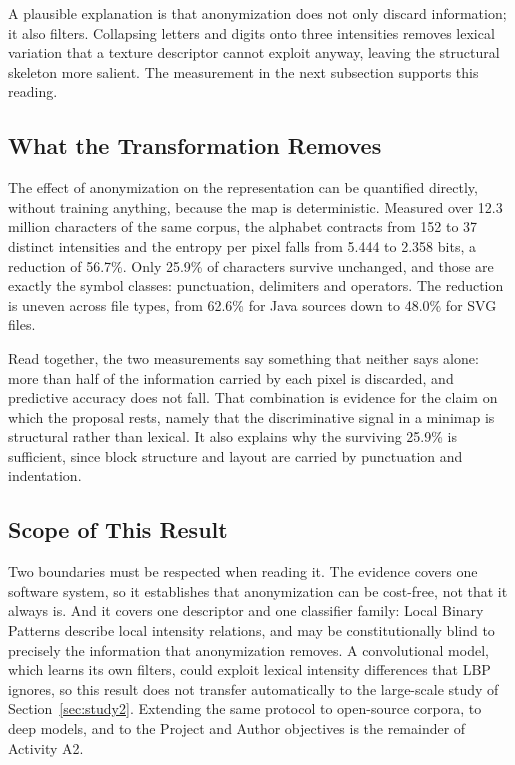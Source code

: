 A plausible explanation is that anonymization does not only discard
information; it also filters. Collapsing letters and digits onto three
intensities removes lexical variation that a texture descriptor cannot exploit
anyway, leaving the structural skeleton more salient. The measurement in the next subsection
supports this reading.

\subsection{What the Transformation Removes}

The effect of anonymization on the representation can be quantified directly,
without training anything, because the map is deterministic. Measured over 12.3
million characters of the same corpus, the alphabet contracts from 152 to 37
distinct intensities and the entropy per pixel falls from 5.444 to 2.358 bits, a
reduction of 56.7\%. Only 25.9\% of characters survive unchanged, and those are
exactly the symbol classes: punctuation, delimiters and operators. The reduction
is uneven across file types, from 62.6\% for Java sources down to 48.0\% for SVG
files.

Read together, the two measurements say something that neither says alone: more
than half of the information carried by each pixel is discarded, and predictive
accuracy does not fall. That combination is evidence for the claim on which the
proposal rests, namely that the discriminative signal in a minimap is structural
rather than lexical. It also explains why the surviving 25.9\% is sufficient,
since block structure and layout are carried by punctuation and indentation.

\subsection{Scope of This Result}

Two boundaries must be respected when reading it. The evidence covers one
software system, so it establishes that anonymization can be cost-free, not that
it always is. And it covers one descriptor and one classifier family: Local
Binary Patterns describe local intensity relations, and may be constitutionally
blind to precisely the information that anonymization removes. A convolutional
model, which learns its own filters, could exploit lexical intensity differences
that LBP ignores, so this result does not transfer automatically to the
large-scale study of Section~\ref{sec:study2}. Extending the same protocol to
open-source corpora, to deep models, and to the Project and Author objectives is
the remainder of Activity A2.

